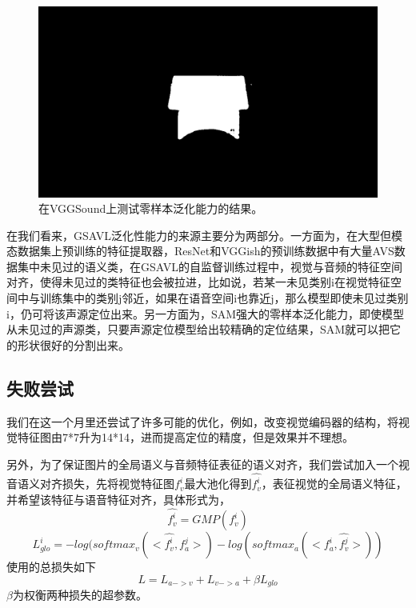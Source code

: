 \documentclass[12pt]{article}
\begin{document}
\begin{figure}[!h]
{\begin{minipage}[t]{0.2\linewidth}
  \end{minipage}%
  \begin{minipage}[t]{0.2\linewidth}
  \centering
  \includegraphics[width=1\linewidth]{zs5.png}
  \end{minipage}%
  }%
  \centering
  \caption{在VGGSound上测试零样本泛化能力的结果。}
  \label{ref:z1}
\end{figure}

在我们看来，GSAVL泛化性能力的来源主要分为两部分。一方面为，在大型但模态数据集上预训练的特征提取器，ResNet和VGGish的预训练数据中有大量AVS数据集中未见过的语义类，在GSAVL的自监督训练过程中，视觉与音频的特征空间对齐，使得未见过的类特征也会被拉进，比如说，若某一未见类别i在视觉特征空间中与训练集中的类别j邻近，如果在语音空间i也靠近j，那么模型即使未见过类别i，仍可将该声源定位出来。另一方面为，SAM强大的零样本泛化能力，即使模型从未见过的声源类，只要声源定位模型给出较精确的定位结果，SAM就可以把它的形状很好的分割出来。
\subsection{失败尝试}
我们在这一个月里还尝试了许多可能的优化，例如，改变视觉编码器的结构，将视觉特征图由7*7升为14*14，进而提高定位的精度，但是效果并不理想。

另外，为了保证图片的全局语义与音频特征表征的语义对齐，我们尝试加入一个视音语义对齐损失，先将视觉特征图$f_v^i$最大池化得到$\hat{f_v^i}$，表征视觉的全局语义特征，并希望该特征与语音特征对齐，具体形式为，
\begin{equation}
    \hat{f_v^i}=GMP(f_v^i)
\end{equation}
\begin{equation}
        L_{glo}^i=-log(softmax_v(<\hat{f_v^i},f_a^j>)-log(softmax_a(<f_a^i,\hat{f_v^j}>))
\end{equation}
使用的总损失如下
\[L=L_{a->v}+L_{v->a}+\beta L_{glo}\]
$\beta$为权衡两种损失的超参数。
\end{document}
